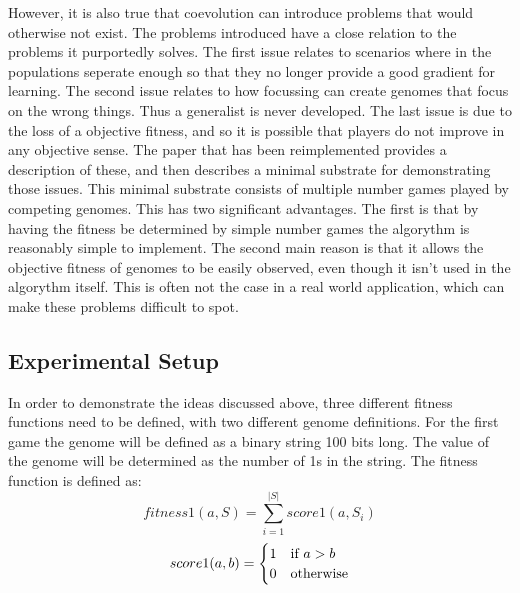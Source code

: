 \documentclass{article}
\begin{document}
However, it is also true that coevolution can introduce problems that would otherwise not exist. The problems introduced have a close relation to the problems it purportedly solves. The first issue relates to scenarios where in the populations seperate enough so that they no longer provide a good gradient for learning. The second issue relates to how focussing can create genomes that focus on the wrong things. Thus a generalist is never developed. The last issue is due to the loss of a objective fitness, and so it is possible that players do not improve in any objective sense. The paper that has been reimplemented provides a description of these, and then describes a minimal substrate for demonstrating those issues\cite{watson2001}. This minimal substrate consists of multiple number games played by competing genomes. This has two significant advantages. The first is that by having the fitness be determined by simple number games the algorythm is reasonably simple to implement. The second main reason is that it allows the objective fitness of genomes to be easily observed, even though it isn't used in the algorythm itself. This is often not the case in a real world application, which can make these problems difficult to spot.

\subsection{Experimental Setup}
In order to demonstrate the ideas discussed above, three different fitness functions need to be defined, with two different genome definitions. For the first game the genome will be defined as a binary string 100 bits long. The value of the genome will be determined as the number of 1s in the string. The fitness function is defined as:
\begin{equation}
fitness1(a, S) = \sum^{|S|}_{i=1}score1(a, S_i)
\end{equation}
\begin{equation}
score1(a, b) = \begin{cases}
1& \text{if $ a > b $}\\
0& \text{otherwise}
\end{cases}
\end{equation}
\end{document}
